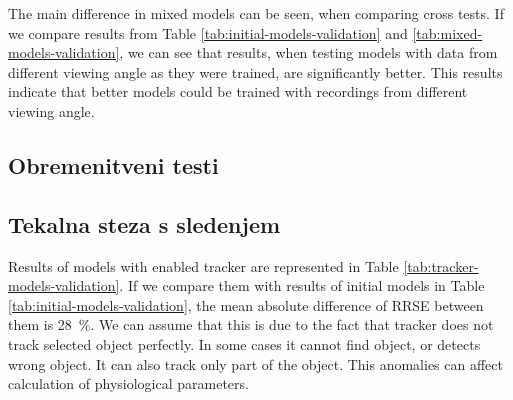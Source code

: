 The main difference in mixed models can be seen, when comparing cross tests. If we compare results from Table \ref{tab:initial-models-validation} and \ref{tab:mixed-models-validation}, we can see that results, when testing models with data from different viewing angle as they were trained, are significantly better. This results indicate that better models could be trained with recordings from different viewing angle.













\subsection{Obremenitveni testi}















\subsection{Tekalna steza s sledenjem}
Results of models with enabled tracker are represented in Table \ref{tab:tracker-models-validation}. If we compare them with results of initial models in Table \ref{tab:initial-models-validation}, the mean absolute difference of RRSE between them is \SI{28}{\%}. We can assume that this is due to the fact that tracker does not track selected object perfectly. In some cases it cannot find object, or detects wrong object. It can also track only part of the object. This anomalies can affect calculation of physiological parameters.

